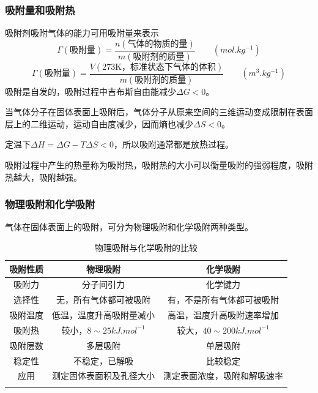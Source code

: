 \begin{frame}
    \frametitle{吸附量和吸附热}

    吸附剂吸附气体的能力可用吸附量来表示
    \[
        \varGamma(\text{吸附量}) = \frac{n(\text{气体的物质的量})}{m(\text{吸附剂的质量})} \qquad (\si{mol.kg^{-1}})
    \]
    \[
        \varGamma(\text{吸附量}) = \frac{V(\text{273K，标准状态下气体的体积})}{m(\text{吸附剂的质量})} \qquad (\si{m^3.kg^{-1}})
    \]
    吸附是自发的，吸附过程中吉布斯自由能减少$\Delta G < 0$。

    当气体分子在固体表面上吸附后，气体分子从原来空间的三维运动变成限制在表面层上的二维运动，运动自由度减少，因而熵也减少$\Delta S < 0$。
    
    定温下$\Delta H = \Delta G - T \Delta S < 0$，所以吸附通常都是放热过程。
    
    吸附过程中产生的热量称为吸附热，吸附热的大小可以衡量吸附的强弱程度，吸附热越大，吸附越强。

\end{frame}


\begin{frame}
    \frametitle{物理吸附和化学吸附}

    气体在固体表面上的吸附，可分为物理吸附和化学吸附两种类型。
    \begin{table}        
            \caption{物理吸附与化学吸附的比较}
            \begin{tabular}{ccc}
                \Xhline{1pt}
                \rowcolor{maincolor!10}
                吸附性质 & 物理吸附 & 化学吸附\\
                \hline
                吸附力 & 分子间引力 & 化学键力\\
                选择性 & 无，所有气体都可被吸附 & 有，不是所有气体都可被吸附\\
                吸附温度 & 低温，温度升高吸附量减小 & 高温，温度升高吸附速率增加\\
                吸附热 & 较小，$8\sim 25\si{kJ.mol^{-1}}$ & 较大，$40\sim 200\si{kJ.mol^{-1}}$\\
                吸附层数 & 多层吸附 &单层吸附 \\
                稳定性 & 不稳定，已解吸 & 比较稳定 \\
                应用 & 测定固体表面积及孔径大小 & 测定表面浓度，吸附和解吸速率\\
                \Xhline{1pt}
            \end{tabular}        
    \end{table}

\end{frame}


